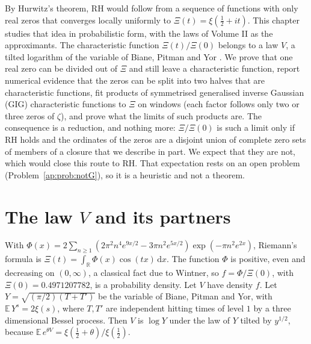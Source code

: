 \label{ap:ch:approx}

By Hurwitz's theorem, RH would follow from a sequence of functions with only real zeros that converges locally uniformly to $\Xi(t)=\xi(\frac12+it)$. This chapter studies that idea in probabilistic form, with the laws of Volume II as the approximants. The characteristic function $\Xi(t)/\Xi(0)$ belongs to a law $V$, a tilted logarithm of the variable of Biane, Pitman and Yor \cite{BPY01}. We prove that one real zero can be divided out of $\Xi$ and still leave a characteristic function, report numerical evidence that the zeros can be split into two halves that are characteristic functions, fit products of symmetrised generalised inverse Gaussian (GIG) characteristic functions to $\Xi$ on windows (each factor follows only two or three zeros of $\zeta$), and prove what the limits of such products are. The consequence is a reduction, and nothing more: $\Xi/\Xi(0)$ is such a limit only if RH holds and the ordinates of the zeros are a disjoint union of complete zero sets of members of a closure that we describe in part. We expect that they are not, which would close this route to RH. That expectation rests on an open problem (Problem~\ref{ap:prob:notG}), so it is a heuristic and not a theorem.

\section{The law \texorpdfstring{$V$}{V} and its partners}\label{ap:sec:law}

With $\Phi(x)=2\sum_{n\ge1}(2\pi^2n^4e^{9x/2}-3\pi n^2e^{5x/2})\exp(-\pi n^2e^{2x})$, Riemann's formula is $\Xi(t)=\int_{\mathbb R}\Phi(x)\cos(tx)\,\mathrm dx$. The function $\Phi$ is positive, even and decreasing on $(0,\infty)$, a classical fact due to Wintner, so $f=\Phi/\Xi(0)$, with $\Xi(0)=0.4971207782$, is a probability density. Let $V$ have density $f$. Let $Y=\sqrt{(\pi/2)(T+T')}$ be the variable of Biane, Pitman and Yor, with $\mathbb E\,Y^s=2\xi(s)$, where $T,T'$ are independent hitting times of level $1$ by a three dimensional Bessel process. Then $V$ is $\log Y$ under the law of $Y$ tilted by $y^{1/2}$, because $\mathbb E\,e^{\theta V}=\xi(\frac12+\theta)/\xi(\frac12)$.

